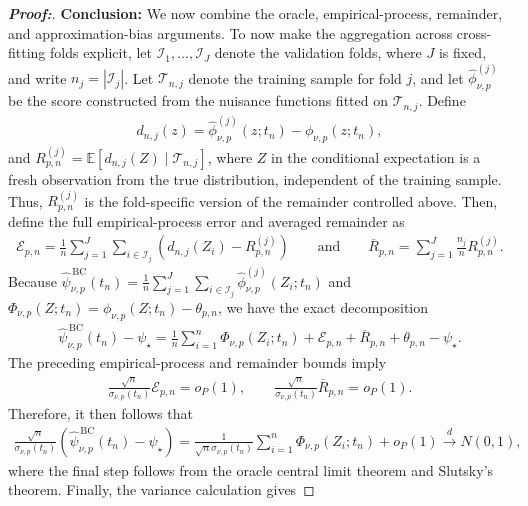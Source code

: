 \documentclass[11pt,twoside]{article}
\theoremstyle{definition}
\theoremstyle{remark}
\begin{document}
\begin{proof}[\textbf{Proof:}]
\medskip
\noindent\textbf{Conclusion:}
We now combine the oracle, empirical-process, remainder, and approximation-bias arguments. To now make the aggregation across cross-fitting folds explicit, let $\mathcal{I}_1,\ldots,\mathcal{I}_J$ denote the validation folds, where $J$ is fixed, and write $n_j=|\mathcal{I}_j|$. Let $\mathcal{T}_{n,j}$ denote the training sample for fold $j$, and let $\widehat\phi_{\nu,p}^{(j)}$ be the score constructed from the nuisance functions fitted on $\mathcal{T}_{n,j}$. Define
\begin{align*}
     d_{n,j}(z) = \widehat\phi_{\nu,p}^{(j)}(z;t_n) - \phi_{\nu,p}(z;t_n),
\end{align*}
and $R_{p,n}^{(j)} = \mathbb{E}\!\left[d_{n,j}(Z) \mid \mathcal{T}_{n,j}\right]$, where $Z$ in the conditional expectation is a fresh observation from the true distribution, independent of the training sample. Thus, $R_{p,n}^{(j)}$ is the fold-specific version of the remainder controlled above. Then, define the full empirical-process error and averaged remainder as
\begin{align*}
    \mathcal{E}_{p,n} = \frac{1}{n} \sum_{j=1}^{J} \sum_{i\in\mathcal{I}_j}\left( d_{n,j}(Z_i)-R_{p,n}^{(j)} \right) \qquad \text{and} \qquad \overline{R}_{p,n} = \sum_{j=1}^{J} \frac{n_j}{n}R_{p,n}^{(j)}.
\end{align*}
Because $\widehat\psi_{\nu,p}^{\,\mathrm{BC}}(t_n) =\frac{1}{n} \sum_{j=1}^{J} \sum_{i\in\mathcal{I}_j} \widehat\phi_{\nu,p}^{(j)}(Z_i;t_n)$ and
$\Phi_{\nu,p}(Z;t_n)=\phi_{\nu,p}(Z;t_n)-\theta_{p,n}$, we have the exact decomposition
\begin{align*}
    \widehat\psi_{\nu,p}^{\,\mathrm{BC}}(t_n)-\psi_\star = \frac{1}{n} \sum_{i=1}^{n}\Phi_{\nu,p}(Z_i;t_n) + \mathcal{E}_{p,n} + \overline{R}_{p,n} + \theta_{p,n}-\psi_\star.
\end{align*}
The preceding empirical-process and remainder bounds imply
\begin{align*}
    \frac{\sqrt{n}}{\sigma_{\nu,p}(t_n)} \mathcal{E}_{p,n} = o_P(1),\qquad \frac{\sqrt{n}}{\sigma_{\nu,p}(t_n)} \overline{R}_{p,n} = o_P(1).
\end{align*}
Therefore, it then follows that
\begin{align*}
    \frac{\sqrt{n}}{\sigma_{\nu,p}(t_n)} \left( \widehat\psi_{\nu,p}^{\,\mathrm{BC}}(t_n)-\psi_\star \right) = \frac{1}{\sqrt{n}\sigma_{\nu,p}(t_n)} \sum_{i=1}^{n}\Phi_{\nu,p}(Z_i;t_n) + o_P(1) \overset{d}{\longrightarrow} N(0,1),
\end{align*}
where the final step follows from the oracle central limit theorem and Slutsky's theorem. Finally, the variance calculation gives

\end{proof}
\end{document}
